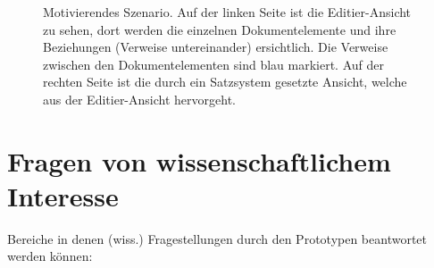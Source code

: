  
\begin{figure}[h!]
\centering
{}
\caption[Motivierendes Szenario]{ Motivierendes Szenario. Auf der linken Seite ist die Editier-Ansicht zu sehen, dort werden die einzelnen Dokumentelemente und ihre Beziehungen (Verweise untereinander) ersichtlich. Die Verweise zwischen den Dokumentelementen sind blau markiert. Auf der rechten Seite ist die durch ein Satzsystem gesetzte Ansicht, welche aus der Editier-Ansicht hervorgeht. }\label{szenario}
\end{figure}
 
\section{Fragen von wissenschaftlichem Interesse}\label{wiss-fragen}
 
Bereiche in denen (wiss.) Fragestellungen durch den Prototypen beantwortet werden können:

